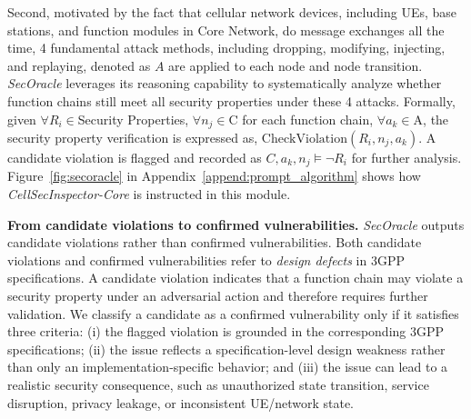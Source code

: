 \documentclass[sigconf]{acmart}
\newcommand{\core}{\textit{CellSecInspector-Core}\xspace}
\begin{document}
{Second, motivated by the fact that cellular network devices, including UEs, base stations, and function modules in Core Network, do message exchanges all the time, 
4 fundamental attack methods, including dropping, modifying, injecting, and replaying, denoted as $A$ are applied to each node and node transition. \textit{SecOracle} leverages its reasoning capability to systematically analyze whether function chains still meet all security properties under these 4 attacks. Formally, given $\forall R_i \in $Security Properties, $\forall n_j \in \text{C}$ for each function chain, $\forall a_k \in \text{A}$,  the security property verification is expressed as, 
\(
\text{CheckViolation}(R_i, n_j, a_k).
\)
A candidate violation is flagged and recorded as 
\(
C, a_k, n_j \models \neg R_i
\) 
for further analysis. 
Figure~\ref{fig:secoracle} in Appendix~\ref{append:prompt_algorithm} shows how \core is instructed in this module.

\noindent \textbf{From candidate violations to confirmed vulnerabilities.}  
\textit{SecOracle} outputs candidate violations rather than confirmed vulnerabilities. Both candidate violations and confirmed vulnerabilities refer to \textit{design defects} in 3GPP specifications. A candidate violation indicates that a function chain may violate a security property under an adversarial action and therefore requires further validation. We classify a candidate as a confirmed vulnerability only if it satisfies three criteria: (i) the flagged violation is grounded in the corresponding 3GPP specifications; (ii) the issue reflects a specification-level design weakness rather than only an implementation-specific behavior; and (iii) the issue can lead to a realistic security consequence, such as unauthorized state transition, service disruption, privacy leakage, or inconsistent UE/network state. 
 

}
\end{document}
